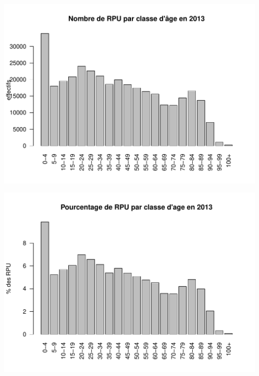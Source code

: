 \documentclass[12pt,english,french,twoside]{book}\usepackage[]{graphicx}\usepackage[]{color}
\makeatletter
\def\maxwidth{ %
  \ifdim\Gin@nat@width>\linewidth
    \linewidth
  \else
    \Gin@nat@width
  \fi
}
\newenvironment{knitrout}{}{} %
\makeatother
\begin{document}




\begin{center}
\begin{knitrout}
\color{fgcolor}
\includegraphics[width=\maxwidth]{figure/affiche_age3-1} 

\includegraphics[width=\maxwidth]{figure/affiche_age3-2} 

\end{knitrout}
\end{center}
\label{fig:tranches_age3}
\end{document}

